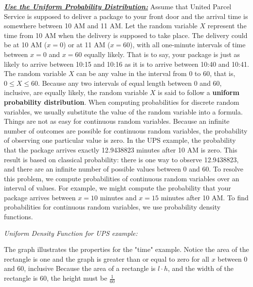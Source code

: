 \documentclass{report}
\begin{document}
      \pagebreak \bigbreak \noindent 
      \textbf{\textit{\underline{Use the Uniform Probability Distribution:}}}
      \bigbreak \noindent 
      Assume that United Parcel Service is supposed to deliver a package to your front door and the arrival time is somewhere between 10 AM and 11 AM. Let the random variable $X$ represent the time from 10 AM when the delivery is supposed to take place.
      \bigbreak \noindent 
    The delivery could be at 10 AM ($x=0$) or at 11 AM ($x=60$), with all one-minute intervals of time between $x=0$ and $x=60$ equally likely. That is to say, your package is just as likely to arrive between 10:15 and 10:16 as it is to arrive between 10:40 and 10:41.
    \bigbreak \noindent 
    The random variable $X$ can be any value in the interval from 0 to 60, that is, $0 \leq X \leq 60$. Because any two intervals of equal length between 0 and 60, inclusive, are equally likely, the random variable $X$ is said to follow a \textbf{uniform probability distribution}.
    \bigbreak \noindent 
    When computing probabilities for discrete random variables, we usually substitute the value of the random variable into a formula.
    \bigbreak \noindent 
    Things are not as easy for continuous random variables. Because an infinite number of outcomes are possible for continuous random variables, the probability of observing one particular value is zero. In the UPS example, the probability that the package arrives exactly 12.9438823 minutes after 10 AM is zero. This result is based on classical probability: there is one way to observe 12.9438823, and there are an infinite number of possible values between 0 and 60. To resolve this problem, we compute probabilities of continuous random variables over an interval of values. For example, we might compute the probability that your package arrives between $x=10$ minutes and $x=15$ minutes after 10 AM. To find probabilities for continuous random variables, we use probability density functions. 

    \bigbreak \noindent 
    \textit{Uniform Density Function for UPS example:}
    \begin{figure}[ht]
        \centering
        \label{fig:figaro}
    \end{figure}
    \bigbreak \noindent 
    The graph illustrates the properties for the "time" example. Notice the area of the rectangle is one and the graph is greater than or equal to zero for all $x $ between 0 and 60, inclusive
    \bigbreak \noindent 
    Because the area of a rectangle is $l\cdot h $, and the width of the rectangle is 60, the height must be $\frac{1}{60}$
    \bigbreak \noindent 
\end{document}
